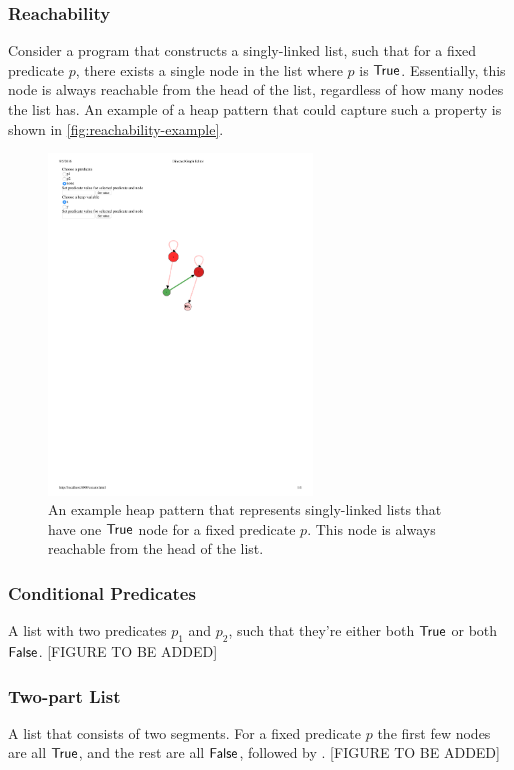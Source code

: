 \subsubsection{Reachability}
Consider a program that constructs a singly-linked list, such that for a fixed
predicate $p$, there exists a single node in the list where $p$ is $\mathsf{True}$. Essentially,
this node is always reachable from the head of the list, regardless of how many nodes the
list has. An example of a heap pattern that could capture such a property is shown
in \autoref{fig:reachability-example}.

\begin{figure}
  \centering
  \includegraphics[width=7cm]{fig/expressiveness1.pdf}
  \caption{An example heap pattern that represents singly-linked lists that have one $\mathsf{True}$ node for a fixed predicate $p$. This node is always reachable from the head of the list.}
  \label{fig:reachability-example}
\end{figure}

\subsubsection{Conditional Predicates}
A list with two predicates $p_1$ and $p_2$, such that they're either both $\mathsf{True}$ or both
$\mathsf{False}$. [FIGURE TO BE ADDED]

\subsubsection{Two-part List}
A list that consists of two segments. For a fixed predicate $p$ the first few nodes are
all $\mathsf{True}$, and the rest are all $\mathsf{False}$, followed by \nilconst. [FIGURE TO BE ADDED]


